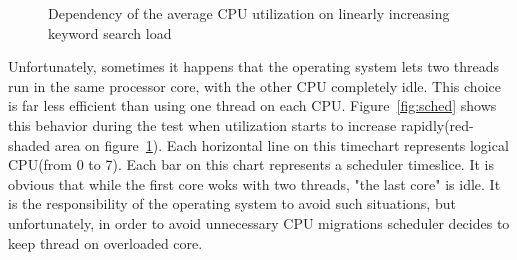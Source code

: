 \documentclass[12pt]{article}
\begin{document}
\begin{figure}[h]
    \centering
	\caption{Dependency of the average CPU utilization on linearly increasing keyword search load}
    \label{fig:cpu}
\end{figure}

Unfortunately, sometimes it happens that the operating system lets two threads run in the same processor core, with the other CPU completely idle. This choice is far less efficient than using one thread on each CPU. Figure~\ref{fig:sched} shows this behavior during the test when utilization starts to increase rapidly(red-shaded area on figure~\ref{fig:cpu}). Each horizontal line on this timechart represents logical CPU(from 0 to 7). Each bar on this chart represents a scheduler timeslice. It is obvious that while the first core woks with two threads, "the last core" is idle. It is the responsibility of the operating system to avoid such situations, but unfortunately, in order to avoid unnecessary CPU migrations scheduler decides to keep thread on overloaded core.  
\end{document}
